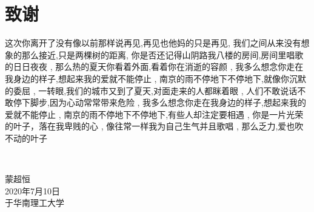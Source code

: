 \chapter{致\texorpdfstring{\quad}{}谢}

这次你离开了没有像以前那样说再见,再见也他妈的只是再见, 我们之间从来没有想象的那么接近,只是两棵树的距离, 你是否还记得山阴路我八楼的房间,房间里唱歌的日日夜夜 , 那么热的夏天你看着外面,看着你在消逝的容颜 , 我多么想念你走在我身边的样子,想起来我的爱就不能停止 , 南京的雨不停地下不停地下,就像你沉默的委屈 , 一转眼,我们的城市又到了夏天,对面走来的人都眯着眼 , 人们不敢说话不敢停下脚步,因为心动常常带来危险 , 我多么想念你走在我身边的样子,想起来我的爱就不能停止 , 南京的雨不停地下不停地下,有些人却注定要相遇 , 你是一片光荣的叶子，落在我卑贱的心 , 像往常一样我为自己生气并且歌唱 , 那么乏力,爱也吹不动的叶子 

~\\

\begin{minipage}[t]{0.945\textwidth}%
	\begin{flushright}
		蒙超恒\\
		2020年7月10日\\	%
		于华南理工大学
		\par\end{flushright}
\end{minipage}

